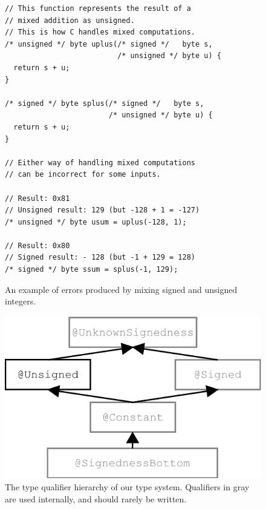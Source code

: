 \begin{figure}[t]
\begin{lstlisting}
// This function represents the result of a
// mixed addition as unsigned.
// This is how C handles mixed computations.
/* unsigned */ byte uplus(/* signed */   byte s,
                          /* unsigned */ byte u) {
  return s + u;
}

/* signed */ byte splus(/* signed */   byte s,
                        /* unsigned */ byte u) {
  return s + u;
}

// Either way of handling mixed computations
// can be incorrect for some inputs.

// Result: 0x81
// Unsigned result: 129 (but -128 + 1 = -127)
/* unsigned */ byte usum = uplus(-128, 1);

// Result: 0x80
// Signed result: - 128 (but -1 + 129 = 128)
/* signed */ byte ssum = splus(-1, 129);

\end{lstlisting}
\vspace{-10pt}
\caption{An example of errors produced by mixing signed and unsigned integers.}
\label{fig:misuse}
\end{figure}

\begin{figure}[t]
\centering
\includegraphics{signedness}
\vspace{-10pt}
\caption{The type qualifier hierarchy of our type system.
Qualifiers in gray are used internally, and should rarely be written.}
\label{fig:type-hierarchy}
\end{figure}

